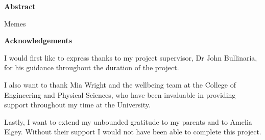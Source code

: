 \thispagestyle{plain}
\vspace*{\fill}
\begin{center}
    \textbf{Abstract}
\end{center}

Memes

\vspace*{\fill}
\pagebreak

\vspace*{\fill}
\begin{center}
    \textbf{Acknowledgements}
\end{center}

\noindent
I would first like to express thanks to my project supervisor, Dr John Bullinaria, for his guidance throughout the duration of the project. 

I also want to thank Mia Wright and the wellbeing team at the College of Engineering and Physical Sciences, who have been invaluable in providing support throughout my time at the University.

Lastly, I want to extend my unbounded gratitude to my parents and to Amelia Elgey. Without their support I would not have been able to complete this project.

\vspace*{\fill}
\pagebreak